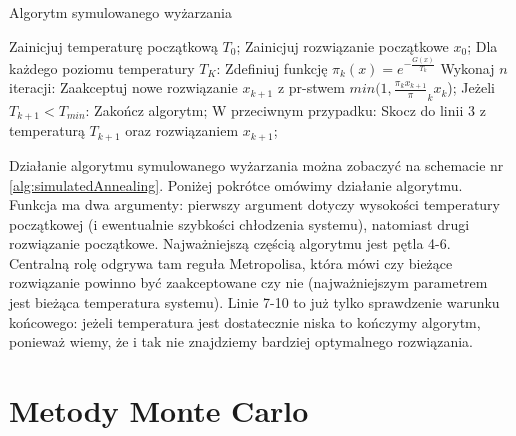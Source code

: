 \documentclass{pracamgr}
\begin{document}
\begin{algorithm}[H]
\caption{Algorytm symulowanego wyżarzania}\label{euclid}

\begin{algorithmic}[1]
  
  \State Zainicjuj temperaturę początkową $T_0$;
  \State Zainicjuj rozwiązanie początkowe $x_0$;
  \State Dla każdego poziomu temperatury $T_K$:
  \State \hspace{\algorithmicindent} Zdefiniuj funkcję $\pi_k(x) = e^{- \frac{G(x)}{T_k}}$
  \State \hspace{\algorithmicindent} Wykonaj $n$ iteracji:
  \State \hspace{\algorithmicindent} \hspace{\algorithmicindent} Zaakceptuj nowe rozwiązanie 
          $x_{k+1}$ z pr-stwem $min(1, \frac{\pi_k{x_{k+1}}}\pi_k{{x_{k}}}$);
  \State  Jeżeli $T_{k+1} < T_{min}$:
  \State  \hspace{\algorithmicindent} Zakończ algorytm;
  \State  W przeciwnym przypadku:
  \State  \hspace{\algorithmicindent}  Skocz do linii 3 z temperaturą $T_{k+1}$ oraz rozwiązaniem $x_{k+1}$;

\end{algorithmic}
\label{alg:simulatedAnnealing}
\end{algorithm}

Działanie algorytmu symulowanego wyżarzania można zobaczyć na schemacie nr 
\ref{alg:simulatedAnnealing}. Poniżej pokrótce omówimy działanie algorytmu.
Funkcja ma dwa argumenty: pierwszy argument dotyczy wysokości temperatury początkowej (i ewentualnie
szybkości chłodzenia systemu), natomiast drugi rozwiązanie początkowe.
Najważniejszą częścią algorytmu jest pętla 4-6. 
Centralną rolę odgrywa tam reguła Metropolisa, która mówi czy bieżące rozwiązanie powinno być 
zaakceptowane czy nie (najważniejszym parametrem jest bieżąca temperatura systemu). 
Linie 7-10 to już tylko sprawdzenie warunku końcowego: jeżeli temperatura jest dostatecznie 
niska to kończymy algorytm, ponieważ wiemy, że i tak nie znajdziemy bardziej optymalnego rozwiązania.



\chapter{Metody Monte Carlo}
\label{chap:monteCarlo}
\end{document}
